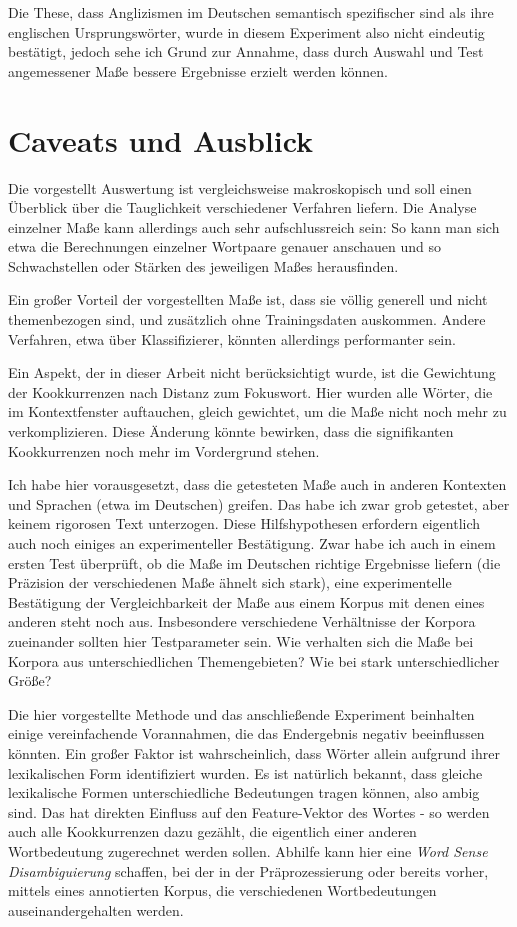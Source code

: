 \documentclass[11pt,numbers=noenddot]{scrartcl}
\begin{document}
Die These, dass Anglizismen im Deutschen semantisch spezifischer sind als ihre englischen Ursprungswörter, wurde in diesem Experiment also nicht eindeutig bestätigt, jedoch sehe ich Grund zur Annahme, dass durch Auswahl und Test angemessener Maße bessere Ergebnisse erzielt werden können.

\section{Caveats und Ausblick} \label{ausblick}

Die vorgestellt Auswertung ist vergleichsweise makroskopisch und soll einen Überblick über die Tauglichkeit verschiedener Verfahren liefern. Die Analyse einzelner Maße kann allerdings auch sehr aufschlussreich sein: So kann man sich etwa die Berechnungen einzelner Wortpaare genauer anschauen und so Schwachstellen oder Stärken des jeweiligen Maßes herausfinden.

Ein großer Vorteil der vorgestellten Maße ist, dass sie völlig generell und nicht themenbezogen sind, und zusätzlich ohne Trainingsdaten auskommen. Andere Verfahren, etwa über Klassifizierer, könnten allerdings performanter sein.

Ein Aspekt, der in dieser Arbeit nicht berücksichtigt wurde, ist die Gewichtung der Kookkurrenzen nach Distanz zum Fokuswort. Hier wurden alle Wörter, die im Kontextfenster auftauchen, gleich gewichtet, um die Maße nicht noch mehr zu verkomplizieren. Diese Änderung könnte bewirken, dass die signifikanten Kookkurrenzen noch mehr im Vordergrund stehen.

Ich habe hier vorausgesetzt, dass die getesteten Maße auch in anderen Kontexten und Sprachen (etwa im Deutschen) greifen. Das habe ich zwar grob getestet, aber keinem rigorosen Text unterzogen. Diese Hilfshypothesen erfordern eigentlich auch noch einiges an experimenteller Bestätigung. Zwar habe ich auch in einem ersten Test überprüft, ob die Maße im Deutschen richtige Ergebnisse liefern (die Präzision der verschiedenen Maße ähnelt sich stark), eine experimentelle Bestätigung der Vergleichbarkeit der Maße aus einem Korpus mit denen eines anderen steht noch aus. Insbesondere verschiedene Verhältnisse der Korpora zueinander sollten hier Testparameter sein. Wie verhalten sich die Maße bei Korpora aus unterschiedlichen Themengebieten? Wie bei stark unterschiedlicher Größe?

Die hier vorgestellte Methode und das anschließende Experiment beinhalten einige vereinfachende Vorannahmen, die das Endergebnis negativ beeinflussen könnten. Ein großer Faktor ist wahrscheinlich, dass Wörter allein aufgrund ihrer lexikalischen Form identifiziert wurden. Es ist natürlich bekannt, dass gleiche lexikalische Formen unterschiedliche Bedeutungen tragen können, also ambig sind. Das hat direkten Einfluss auf den Feature-Vektor des Wortes - so werden auch alle Kookkurrenzen dazu gezählt, die eigentlich einer anderen Wortbedeutung zugerechnet werden sollen. Abhilfe kann hier eine \emph{Word Sense Disambiguierung} schaffen, bei der in der Präprozessierung oder bereits vorher, mittels eines annotierten Korpus, die verschiedenen Wortbedeutungen auseinandergehalten werden.
\end{document}
